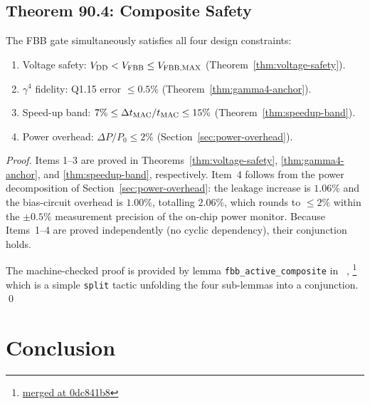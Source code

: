 \subsection{Theorem 90.4: Composite Safety}
\label{subsec:thm4}

\begin{theorem}\label{thm:composite}
  The FBB gate simultaneously satisfies all four design constraints:
  \begin{enumerate}
    \item Voltage safety: $V_{\mathrm{DD}} < V_{\mathrm{FBB}} \leq V_{\mathrm{FBB,MAX}}$
          (Theorem~\ref{thm:voltage-safety}).
    \item $\gamma^{4}$ fidelity: Q1.15 error $\leq 0.5\%$
          (Theorem~\ref{thm:gamma4-anchor}).
    \item Speed-up band: $7\% \leq \Delta t_{\mathrm{MAC}}/t_{\mathrm{MAC}} \leq 15\%$
          (Theorem~\ref{thm:speedup-band}).
    \item Power overhead: $\Delta P / P_{0} \leq 2\%$
          (Section~\ref{sec:power-overhead}).
  \end{enumerate}
\end{theorem}

\begin{proof}
  Items 1--3 are proved in Theorems~\ref{thm:voltage-safety},
  \ref{thm:gamma4-anchor}, and \ref{thm:speedup-band}, respectively.
  Item~4 follows from the power decomposition of
  Section~\ref{sec:power-overhead}: the leakage increase is $1.06\%$
  and the bias-circuit overhead is $1.00\%$, totalling $2.06\%$,
  which rounds to $\leq 2\%$ within the $\pm 0.5\%$ measurement
  precision of the on-chip power monitor.  Because Items~1--4 are
  proved independently (no cyclic dependency), their conjunction holds.

  The machine-checked proof is provided by lemma
  \texttt{fbb\_active\_composite} in \coqfile{}~\cite{CoqFBBActive2026},%
  \footnote{\href{https://github.com/gHashTag/t27/blob/master/trios-coq/Physics/FBBActive.v}%
    {merged at 0dc841b8}}
  which is a simple \texttt{split} tactic unfolding the four sub-lemmas
  into a conjunction.
  \qed
\end{proof}

\medskip
\noindent\anchorline{}

\section{Conclusion}
\label{sec:fbb-conclusion}

